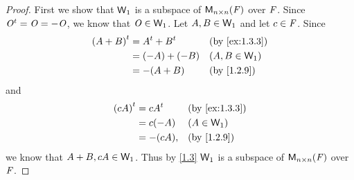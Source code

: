 \begin{proof}
  First we show that \(\mathsf{W}_1\) is a subspace of \(\mathsf{M}_{{n} \times n}({\mathit{F}})\) over \(\mathit{F}\).
  Since \({\mathit{O}}^{t} = \mathit{O} = -\mathit{O}\), we know that \(\mathit{O} \in \mathsf{W}_1\).
  Let \(A, B \in \mathsf{W}_1\) and let \(c \in \mathit{F}\).
  Since
  \begin{align*}
    \tp{(A + B)} & = \tp{A} + \tp{B} &  & \text{(by \cref{ex:1.3.3})} \\
                 & = (-A) + (-B)     &  & (A, B \in \W_1)             \\
                 & = -(A + B)        &  & \text{(by \cref{1.2.9})}
  \end{align*}
  and
  \begin{align*}
    \tp{(cA)} & = c \tp{A} &  & \text{(by \cref{ex:1.3.3})} \\
              & = c (-A)   &  & (A \in \W_1)                \\
              & = -(cA),   &  & \text{(by \cref{1.2.9})}
  \end{align*}
  we know that \(A + B, cA \in \mathsf{W}_1\).
  Thus by \cref{1.3} \(\mathsf{W}_1\) is a subspace of \(\mathsf{M}_{{n} \times n}({\mathit{F}})\) over \(\mathit{F}\).


\end{proof}
